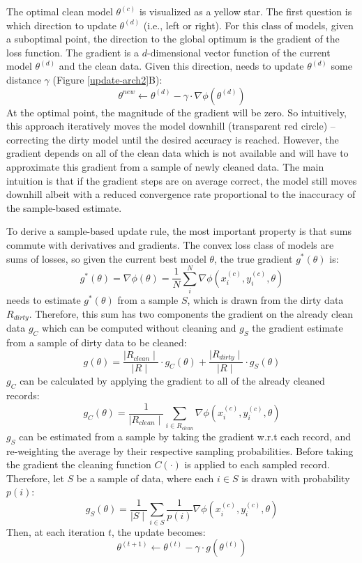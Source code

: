 The optimal clean model $\theta^{(c)}$ is visualized as a yellow star.
The first question is which direction to update $\theta^{(d)}$ (i.e., left or right).
For this class of models, given a suboptimal point, the direction to 
the global optimum is the gradient of the loss function.
The gradient is a $d$-dimensional vector function of the current model $\theta^{(d)}$ and the clean data.
Given this direction, \sys needs to update $\theta^{(d)}$ some distance $\gamma$ (Figure \ref{update-arch2}B):
\[
\theta^{new} \leftarrow \theta^{(d)} - \gamma \cdot \nabla\phi(\theta^{(d)})
\]
At the optimal point, the magnitude of the gradient will be zero.
So intuitively, this approach iteratively moves the model downhill (transparent red circle) -- correcting the dirty model until the desired accuracy is reached.
However, the gradient depends on all of the clean data which is not available and \sys will have to approximate this gradient from a sample of newly cleaned data.
The main intuition is that if the gradient steps are on average correct, the model still moves downhill albeit with a reduced convergence rate proportional to the inaccuracy of the sample-based estimate.

To derive a sample-based update rule, the most important property is that sums commute with derivatives and gradients.
The convex loss class of models are sums of losses, so given the current best model $\theta$, the true gradient $g^*(\theta)$ is:
\[
g^*(\theta) = \nabla\phi(\theta) = \frac{1}{N} \sum_i^N \nabla\phi(x_i^{(c)},y_i^{(c)},\theta)
\]
\sys needs to estimate $g^*(\theta)$ from a sample $S$, which is drawn from the dirty data $R_{dirty}$.
 Therefore, this sum has two components the gradient on the already clean data $g_C$ which can be computed without cleaning and $g_S$ the gradient estimate from a sample of dirty data to be cleaned:
\[
g(\theta) = \frac{\mid R_{clean} \mid}{\mid R \mid} \cdot g_C(\theta) + \frac{\mid R_{dirty} \mid}{\mid R \mid} \cdot g_S(\theta)
\]
$g_C$ can be calculated by applying the gradient to all of the already cleaned records:
\[
g_C(\theta) = \frac{1}{\mid R_{clean}\mid}\sum_{i \in R_{clean}}\nabla\phi(x_i^{(c)},y_i^{(c)},\theta)
\]
$g_S$ can be estimated from a sample by taking the gradient w.r.t each record, and re-weighting the average by their respective sampling probabilities.
Before taking the gradient the cleaning function $C(\cdot)$ is applied to each sampled record.
Therefore, let $S$ be a sample of data, where each $i \in S$ is drawn with probability $p(i)$:
\[
g_{S}(\theta) = \frac{1}{\mid S \mid} \sum_{i \in S}\frac{1}{p(i)}\nabla\phi(x_i^{(c)},y_i^{(c)},\theta)
\]
Then, at each iteration $t$, the update becomes:
\[
\theta^{(t+1)} \leftarrow \theta^{(t)} - \gamma \cdot g(\theta^{(t)})
\]

